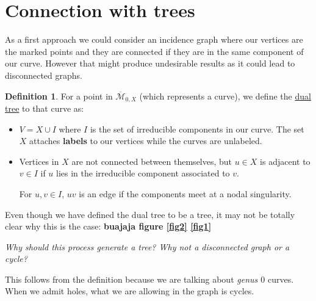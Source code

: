 \documentclass[11pt]{article}
\newcommand{\ov}{\overline}        %
\newcommand{\cM}{\mathcal{M}}           %
\theoremstyle{definition}
\newtheorem{Def}{Definition}           %
\theoremstyle{remark}
\numberwithin{theorem}{section}
\begin{document}
\section{Connection with trees}

As a first approach we could consider an incidence graph where our vertices are the marked points and they are connected if they are in the same component of our curve. However that might produce undesirable results as it could lead to disconnected graphs.

\begin{Def}
For a point in $\ov{\cM}_{0,X}$ (which represents a curve), we define the \underline{dual tree} to that curve as:
\begin{itemize}
    \item $V=X\cup I$ where $I$ is the set of irreducible components in our curve. The set $X$ attaches \textbf{labels} to our vertices while the curves are unlabeled.
    \item Vertices in $X$ are not connected between themselves, but $u\in X$ is adjacent to $v\in I$ if $u$ lies in the irreducible component associated to $v$.\par 
    For $u,v\in I$, $uv$ is an edge if the components meet at a nodal singularity.
\end{itemize}
\end{Def}

Even though we have defined the dual tree to be a tree, it may not be totally clear why this is the case: \textbf{buajaja figure \ref{fig2} \ref{fig1}}
\begin{center}\begin{minipage}{0.9\textwidth}\centering\em
    Why should this process generate a tree? Why not a disconnected graph or a cycle?
\end{minipage}\end{center}
This follows from the definition because we are talking about \emph{genus $0$} curves. When we admit holes, what we are allowing in the graph is cycles.
\end{document}
